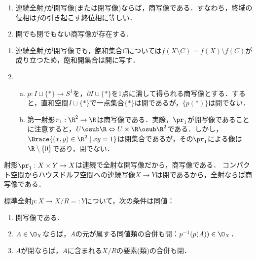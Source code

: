 \documentclass[uplatex,dvipdfmx]{jsreport}
\begin{document}
\begin{corollary}\mbox{}\label{cor-open-continuous-surjection-is-quotient-map}
    \begin{enumerate}
        \item 連続全射$f$が開写像(または閉写像)ならば，商写像である．すなわち，終域の位相は$f$の引き起こす終位相に等しい．
        \item 開でも閉でもない商写像が存在する．
    \end{enumerate}
\end{corollary}
\begin{Proof}\mbox{}
    \begin{enumerate}
        \item 連続全射$f$が閉写像でも，飽和集合$C$については$f(X\setminus C)=f(X)\setminus f(C)$が成り立つため，飽和開集合は開に写す．
        \item \mbox{}\begin{enumerate}[(a)]
            \item $p:I\sqcup\{*\}\to S^1$を，$\partial I\cup\{*\}$を1点に潰して得られる商写像とする．すると，直和空間$I\sqcup\{*\}$で一点集合$\{*\}$は開であるが，$\{p(*)\}$は開でない．
            \item 第一射影$\pi_1:\R^2\to\R$は商写像である．実際，$\pr_1$が開写像であることに注意すると，$U\osub\R\Leftrightarrow U\times\R\osub\R^2$である．しかし，$\Brace{(x,y)\in\R^2\mid xy=1}$は閉集合であるが，その$\pr_1$による像は$\R\setminus\{0\}$であり，閉でない．
        \end{enumerate}
    \end{enumerate}
\end{Proof}
\begin{example}
    射影$\pr_1:X\times Y\to X$は連続で全射な開写像だから，商写像である．
    コンパクト空間からハウスドルフ空間への連続写像$X\to Y$は閉であるから，全射ならば商写像である．
\end{example}

\begin{proposition}[標準全射が開であるための必要十分条件]
    標準全射$p:X\to X/R=:Y$について，次の条件は同値：
    \begin{enumerate}
        \item 開写像である．
        \item $A\in\O_X$ならば，$A$の元が属する同値類の合併も開：$p^{-1}(p(A))\in\O_X$．
        \item $A$が閉ならば，$A$に含まれる$X/R$の要素(類)の合併も閉．
    \end{enumerate}
\end{proposition}
\end{document}
